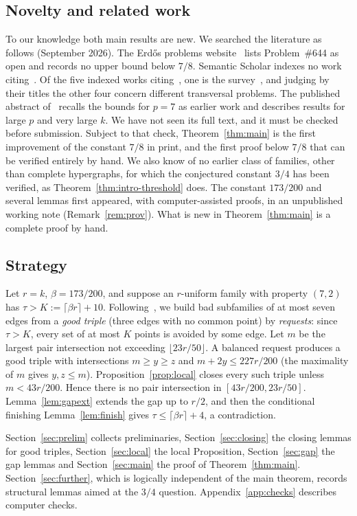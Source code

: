 \documentclass[11pt]{amsart}
\theoremstyle{definition}
\theoremstyle{remark}
\newcommand{\ceil}[1]{\lceil #1\rceil}
\newcommand{\floor}[1]{\lfloor #1\rfloor}
\begin{document}
\subsection*{Novelty and related work}
To our knowledge both main results are new. We searched the literature as follows (September 2026). The Erd\H{o}s problems website~\cite{EP} lists Problem~\#644 as open and records no upper bound below $7/8$. Semantic Scholar indexes no work citing~\cite{FKW}. Of the five indexed works citing~\cite{Kos}, one is the survey~\cite{BKS}, and judging by their titles the other four concern different transversal problems. The published abstract of~\cite{Kos} recalls the bounds for $p=7$ as earlier work and describes results for large $p$ and very large $k$. We have not seen its full text, and it must be checked before submission. Subject to that check, Theorem~\ref{thm:main} is the first improvement of the constant $7/8$ in print, and the first proof below $7/8$ that can be verified entirely by hand. We also know of no earlier class of families, other than complete hypergraphs, for which the conjectured constant $3/4$ has been verified, as Theorem~\ref{thm:intro-threshold} does. The constant $173/200$ and several lemmas first appeared, with computer-assisted proofs, in an unpublished working note (Remark~\ref{rem:prov}). What is new in Theorem~\ref{thm:main} is a complete proof by hand.

\subsection*{Strategy}
Let $r=k$, $\beta=173/200$, and suppose an $r$-uniform family with property $(7,2)$ has $\tau>K:=\ceil{\beta r}+10$. Following~\cite{FKW}, we build bad subfamilies of at most seven edges from a \emph{good triple} (three edges with no common point) by \emph{requests}: since $\tau>K$, every set of at most $K$ points is avoided by some edge. Let $m$ be the largest pair intersection not exceeding $\floor{23r/50}$. A balanced request produces a good triple with intersections $m\ge y\ge z$ and $m+2y\le227r/200$ (the maximality of $m$ gives $y,z\le m$). Proposition~\ref{prop:local} closes every such triple unless $m<43r/200$. Hence there is no pair intersection in $[43r/200,23r/50]$. Lemma~\ref{lem:gapext} extends the gap up to $r/2$, and then the conditional finishing Lemma~\ref{lem:finish} gives $\tau\le\ceil{\beta r}+4$, a contradiction.

Section~\ref{sec:prelim} collects preliminaries, Section~\ref{sec:closing} the closing lemmas for good triples, Section~\ref{sec:local} the local Proposition, Section~\ref{sec:gap} the gap lemmas and Section~\ref{sec:main} the proof of Theorem~\ref{thm:main}. Section~\ref{sec:further}, which is logically independent of the main theorem, records structural lemmas aimed at the $3/4$ question. Appendix~\ref{app:checks} describes computer checks.
\end{document}
